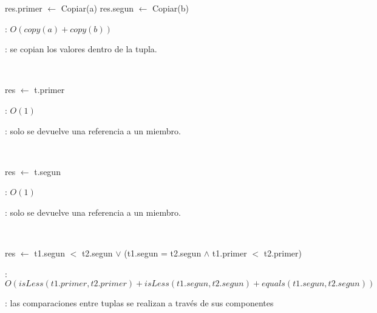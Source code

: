 \begin{Algoritmos}

	\begin{algorithm}[H]
		\NoCaptionOfAlgo
		\caption{}
		res.primer $\leftarrow$ Copiar(a)
		res.segun $\leftarrow$ Copiar(b)
	\end{algorithm}

	\complejidad: $O(copy(a) + copy(b))$

	\justifcomp: se copian los valores dentro de la tupla.

	~

	\begin{algorithm}[H]
		\NoCaptionOfAlgo
		\caption{}
		res $\leftarrow$ t.primer
	\end{algorithm}

	\complejidad: $O(1)$

	\justifcomp: solo se devuelve una referencia a un miembro.

	~

	\begin{algorithm}[H]
		\NoCaptionOfAlgo
		\caption{}
		res $\leftarrow$ t.segun
	\end{algorithm}

	\complejidad: $O(1)$

	\justifcomp: solo se devuelve una referencia a un miembro.

	~

	\begin{algorithm}[H]
		\NoCaptionOfAlgo
		\caption{}
		res $\leftarrow$ t1.segun $<$ t2.segun $\lor$ (t1.segun = t2.segun $\land$ t1.primer $<$ t2.primer)
	\end{algorithm}

	\complejidad: $O(isLess(t1.primer, t2.primer) + isLess(t1.segun, t2.segun) + equals(t1.segun, t2.segun))$

	\justifcomp: las comparaciones entre tuplas se realizan a través de sus componentes

\end{Algoritmos}